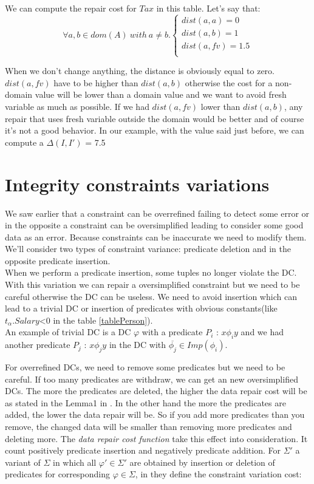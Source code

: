 \documentclass[letterpaper, 12pt]{report}
\begin{document}
We can compute the repair cost for $Tax$ in this table. Let's say that:\\

$$
\forall a,b \in dom(A) \ with \ a \neq b.
\left\{
	\begin{array}{ll}
	   dist(a,a)=0\\
	   dist(a,b)=1\\
	   dist(a,fv)=1.5\\
	\end{array}
\right.
$$

When we don't change anything, the distance is obviously equal to zero. $dist(a,fv)$ have to be higher than $dist(a,b)$ otherwise the cost for a non-domain value will be lower than a domain value and we want to avoid fresh variable as much as possible. If we had $dist(a,fv)$ lower than $dist(a,b)$, any repair that uses fresh variable outside the domain would be better and of course it's not a good behavior. In our example, with the value said just before, we can compute a $\Delta(I,I')$ = 7.5

\section{Integrity constraints variations}

We saw earlier that a constraint can be overrefined failing to detect some error or in the opposite a constraint can be oversimplified leading to consider some good data as an error. Because constraints can be inaccurate we need to modify them. We'll consider two types of constraint variance: predicate deletion and in the opposite predicate insertion.\\

When we perform a predicate insertion, some tuples no longer violate the DC. With this variation we can repair a oversimplified constraint but we need to be careful otherwise the DC can be useless. We need to avoid insertion which can lead to a trivial DC or insertion of predicates with obvious constants(like $t_\alpha.Salary$<0 in the table \ref{tablePerson}). \\

An example of trivial DC is a DC $\varphi$ with a predicate $P_i$ : $x \phi_i y$ and we had another predicate $P_j$ : $x \phi_j y$ in the DC with $\overline{\phi_j} \in Imp(\phi_i)$. 

For overrefined DCs, we need to remove some predicates but we need to be careful. If too many predicates are withdraw, we can get an new oversimplified DCs. The more the predicates are deleted, the higher the data repair cost will be as stated in the Lemma1 in \cite{main}. In the other hand the more the predicates are added, the lower the data repair will be. So if you add more predicates than you remove, the changed data will be smaller than removing more predicates and deleting more. The \emph{data repair cost function} take this effect into consideration. It count positively predicate insertion and negatively predicate addition. For $\Sigma '$ a variant of $\Sigma$ in which all $\varphi ' \in \Sigma '$ are obtained by insertion or deletion of predicates for corresponding $\varphi \in \Sigma$, in \cite{main} they define the constraint variation cost:
\end{document}
